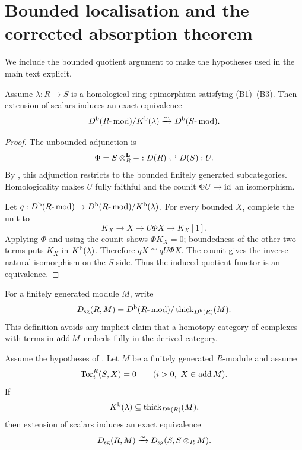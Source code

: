 
\section{Bounded localisation and the corrected absorption theorem}\label{app:bounded-localisation}

We include the bounded quotient argument to make the hypotheses used in the main text explicit.

\begin{theorem}\label{thm:appendix-bounded-localisation}
Assume \(\lambda:R\to S\) is a homological ring epimorphism satisfying \textup{(B1)--(B3)}.  Then extension of scalars induces an exact equivalence
\[
 D^{\mathrm b}(R\text{-}\operatorname{mod})/K^{\mathrm b}(\lambda)
 \xrightarrow{\sim}
 D^{\mathrm b}(S\text{-}\operatorname{mod}).
\]
\end{theorem}

\begin{proof}
The unbounded adjunction is
\[
 \Phi=S\otimes^{\mathbf L}_R-:D(R)\rightleftarrows D(S):U.
\]
By , this adjunction restricts to the bounded finitely generated subcategories.  Homologicality makes \(U\) fully faithful and the counit \(\Phi U\to\operatorname{id}\) an isomorphism.

Let \(q:D^{\mathrm b}(R\text{-}\operatorname{mod})\to D^{\mathrm b}(R\text{-}\operatorname{mod})/K^{\mathrm b}(\lambda)\).  For every bounded \(X\), complete the unit to
\[
 K_X\longrightarrow X\longrightarrow U\Phi X\longrightarrow K_X[1].
\]
Applying \(\Phi\) and using the counit shows \(\Phi K_X=0\); boundedness of the other two terms puts \(K_X\) in \(K^{\mathrm b}(\lambda)\).  Therefore \(qX\cong qU\Phi X\).  The counit gives the inverse natural isomorphism on the \(S\)-side.  Thus the induced quotient functor is an equivalence.
\end{proof}

For a finitely generated module \(M\), write
\[
 D_{\mathrm{sg}}(R,M)=D^{\mathrm b}(R\text{-}\operatorname{mod})/\operatorname{thick}_{D^{\mathrm b}(R)}(M).
\]
This definition avoids any implicit claim that a homotopy category of complexes with terms in \(\operatorname{add} M\) embeds fully in the derived category.

\begin{theorem}\label{thm:correct-absorption}
Assume the hypotheses of .  Let \(M\) be a finitely generated \(R\)-module and assume
\[
 \operatorname{Tor}_i^R(S,X)=0
 \qquad(i>0,\ X\in\operatorname{add} M).
\]
If
\[
 K^{\mathrm b}(\lambda)\subseteq\operatorname{thick}_{D^{\mathrm b}(R)}(M),
\]
then extension of scalars induces an exact equivalence
\[
 D_{\mathrm{sg}}(R,M)
 \xrightarrow{\sim}
 D_{\mathrm{sg}}(S,S\otimes_RM).
\]
\end{theorem}

